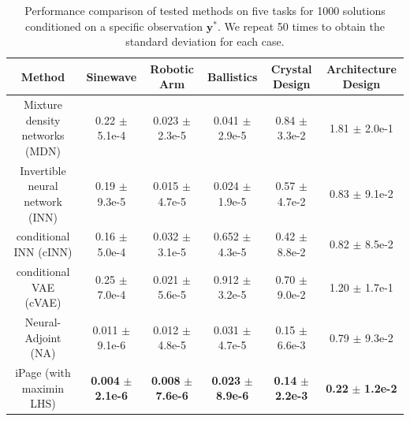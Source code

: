 \documentclass[letterpaper]{article} %
\begin{document}
\begin{table}[!h] 
\footnotesize
\centering
\caption{Performance comparison of tested methods on five tasks for 1000 solutions conditioned on a specific observation $\mathbf{y}^*$. We repeat 50 times to obtain the standard deviation for each case.} 
\vspace{-0.2cm}
\label{tab:1_y}
\begin{tabular}{@{}cccccc@{}}
\toprule
Method & Sinewave     & Robotic Arm     & Ballistics     & Crystal Design  & Architecture Design \\ \midrule
Mixture density networks (MDN)    & 0.22 $\pm$ 5.1e-4 & 0.023 $\pm$ 2.3e-5  & 0.041 $\pm$ 2.9e-5 & 0.84 $\pm$ 3.3e-2   & 1.81 $\pm$ 2.0e-1\\
Invertible neural network (INN)    & 0.19 $\pm$ 9.3e-5  & 0.015 $\pm$ 4.7e-5  & {0.024} $\pm$ 1.9e-5 & 0.57 $\pm$ 4.7e-2  & 0.83 $\pm$ 9.1e-2 \\
conditional INN (cINN)   & 0.16 $\pm$ 5.0e-4  & 0.032 $\pm$ 3.1e-5   & 0.652 $\pm$ 4.3e-5   & 0.42 $\pm$ 8.8e-2 & 0.82 $\pm$ 8.5e-2   \\
conditional VAE (cVAE)   & 0.25 $\pm$ 7.0e-4  & 0.021 $\pm$ 5.6e-5   & 0.912 $\pm$ 3.2e-5   & 0.70 $\pm$ 9.0e-2  & 1.20 $\pm$ 1.7e-1 \\
Neural-Adjoint (NA)     & 0.011 $\pm$ 9.1e-6 & 0.012 $\pm$ 4.8e-5  & 0.031 $\pm$ 4.7e-5   & {0.15} $\pm$ 6.6e-3  & 0.79 $\pm$ 9.3e-2 \\ \midrule
iPage (with maximin LHS) & {\bf 0.004} $\pm$ {\bf 2.1e-6} & {\bf0.008} $\pm$ {\bf7.6e-6}  & {\bf 0.023} $\pm$ {\bf 8.9e-6}   & {\bf0.14} $\pm$ {\bf 2.2e-3}  & {\bf 0.22} $\pm$ {\bf 1.2e-2}  \\ \bottomrule
\end{tabular}
\end{table}
\end{document}
